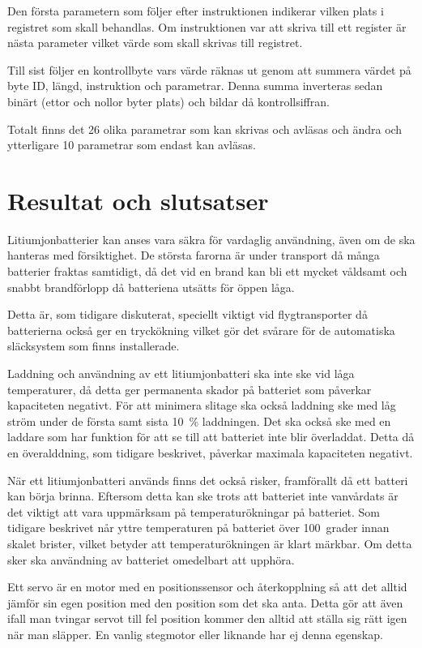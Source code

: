\documentclass[a4paper,12pt]{article}
\begin{document}
Den första parametern som följer efter instruktionen indikerar vilken plats i registret som skall behandlas. Om instruktionen var att skriva till ett register är nästa parameter vilket värde som skall skrivas till registret. 

Till sist följer en kontrollbyte vars värde räknas ut genom att summera värdet på byte ID, längd, instruktion och parametrar. Denna summa inverteras sedan binärt (ettor och nollor byter plats) och bildar då kontrollsiffran.

Totalt finns det 26 olika parametrar som kan skrivas och avläsas och ändra och ytterligare 10 parametrar som endast kan avläsas. 
 
\section{Resultat och slutsatser}
Litiumjonbatterier kan anses vara säkra för vardaglig användning, även om de ska hanteras med försiktighet. De största farorna är under transport då många batterier fraktas samtidigt, då det vid en brand kan bli ett mycket våldsamt och snabbt brandförlopp då batteriena utsätts för öppen låga.

Detta är, som tidigare diskuterat, speciellt viktigt vid flygtransporter då batterierna också ger en tryckökning vilket gör det svårare för de automatiska släcksystem som finns installerade.

Laddning och användning av ett litiumjonbatteri ska inte ske vid låga temperaturer, då detta ger permanenta skador på batteriet som påverkar kapaciteten negativt. För att minimera slitage ska också laddning ske med låg ström under de första samt sista 10~\% laddningen. Det ska också ske med en laddare som har funktion för att se till att batteriet inte blir överladdat. Detta då en överalddning, som tidigare beskrivet, påverkar maximala kapaciteten negativt.

När ett litiumjonbatteri används finns det också risker, framförallt då ett batteri kan börja brinna. Eftersom detta kan ske trots att batteriet inte vanvårdats är det viktigt att vara uppmärksam på temperaturökningar på batteriet. Som tidigare beskrivet når yttre temperaturen på batteriet över 100~grader innan skalet brister, vilket betyder att temperaturökningen är klart märkbar. Om detta sker ska användning av batteriet omedelbart att upphöra.

Ett servo är en motor med en positionssensor och återkopplning så att det alltid jämför sin egen position med den position som det ska anta. Detta gör att även ifall man tvingar servot till fel position kommer den alltid att ställa sig rätt igen när man släpper. En vanlig stegmotor eller liknande har ej denna egenskap.
\end{document}

